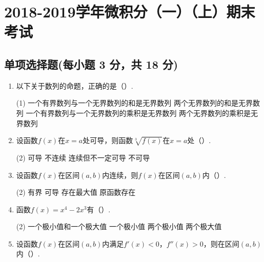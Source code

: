 \documentclass[../main.tex]{subfiles}
\begin{document}
\chapter{2018-2019学年微积分（一）（上）期末考试}

\section{单项选择题(每小题 3 分，共 18 分)}
\begin{enumerate}
    \item 以下关于数列的命题，正确的是（\qquad）.

          \begin{tasks}[label=\textbf{\Alph*.}, label-width=1.5em, column-sep=1em](1)
              \task 一个有界数列与一个无界数列的和是无界数列
              \task 两个无界数列的和是无界数列
              \task 一个有界数列与一个无界数列的乘积是无界数列
              \task 两个无界数列的乘积是无界数列
          \end{tasks}

    \item 设函数$f(x)$在$x=a$处可导，则函数$\sqrt[3]{f(x)}$在$x=a$处（\qquad）.

          \begin{tasks}[label=\textbf{\Alph*.}, label-width=1.5em, column-sep=1em](2)
              \task 可导
              \task 不连续
              \task 连续但不一定可导
              \task 不可导
          \end{tasks}

    \item 设函数$f(x)$在区间$(a,b)$内连续，则$f(x)$在区间$(a,b)$内（\qquad）.

          \begin{tasks}[label=\textbf{\Alph*.}, label-width=1.5em, column-sep=1em](2)
              \task 有界
              \task 可导
              \task 存在最大值
              \task 原函数存在
          \end{tasks}

    \item 函数$f(x)=x^{4}-2x^{3}$有（\qquad）.

          \begin{tasks}[label=\textbf{\Alph*.}, label-width=1.5em, column-sep=1em](2)
              \task 一个极小值和一个极大值
              \task 一个极小值
              \task 两个极小值
              \task 两个极大值
          \end{tasks}

    \item 设函数$f(x)$在区间$(a,b)$内满足$f'(x)<0$，$f''(x)>0$，则在区间$(a,b)$内（\qquad）.


\end{enumerate}
\end{document}
